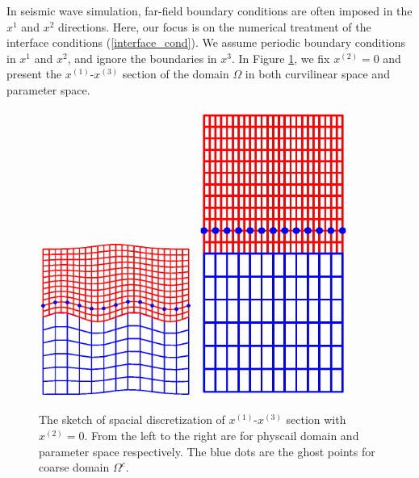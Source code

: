In seismic wave simulation, far-field boundary conditions are often imposed in the $x^1$ and $x^2$ directions. Here, our focus is on the numerical treatment of the interface conditions (\ref{interface_cond}). We assume periodic boundary conditions in $x^1$ and $x^2$, and ignore the boundaries in $x^3$. In Figure \ref{section_discretization}, we fix $x^{(2)} = 0$ and present the $x^{(1)}$-$x^{(3)}$ section of the domain $\Omega$ in both curvilinear space and parameter space.
\begin{figure}[htbp]
	\centering
	\includegraphics[width=0.45\textwidth,trim={1.0cm 2.0cm 1.0cm 1.8cm}, clip]{physical_section_discretization.eps}
	\includegraphics[width=0.45\textwidth,trim={1.0cm 2.0cm 1cm 1.8cm}, clip]{parameter_section_discretization.eps}
	\caption{The sketch of spacial discretization of $x^{(1)}$-$x^{(3)}$ section with $x^{(2)} = 0$. From the left to the right are for physcail domain and parameter space respectively. The blue dots are the ghost points for coarse domain $\Omega^c$.}\label{section_discretization}
\end{figure}
